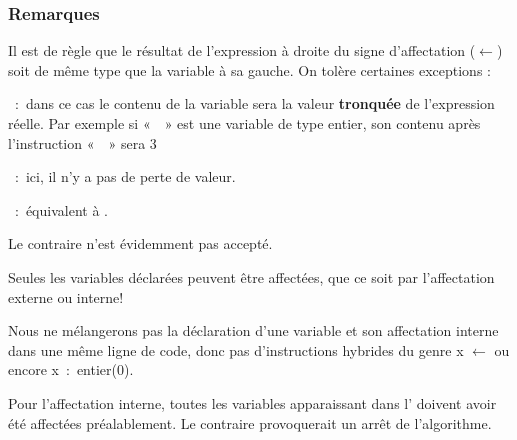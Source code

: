 			
			\subsubsection*{Remarques}

			\begin{liste}
			\item
				Il est de règle que le résultat de l’expression à droite du signe
				d’affectation ($\gets$) soit de
				même type que la variable à sa gauche. On tolère certaines exceptions
				:
				\begin{liste}
				\item
					~:~dans ce cas le contenu de la variable sera 
                    la valeur \textbf{tronquée} de l’expression réelle. 
					Par exemple si «~~» est
					une variable de type entier, son contenu après l’instruction
					«~~» 
					sera 3
				\item 
					~:~ici, il n’y a pas de perte de valeur.
				\item 
					~:~équivalent à 
                    .
					
					Le contraire n’est évidemment pas accepté.
				\end{liste}
			\item 
				Seules les variables déclarées peuvent être affectées, que ce soit par
				l’affectation externe ou interne!
			\item 
				Nous ne mélangerons pas la déclaration d’une variable et son
				affectation interne dans une même ligne de code, donc pas
				d’instructions hybrides du genre 
				\textsf{x}{ $\gets$ } ou encore 
				\textsf{x~:~entier(0)}.
			\item 
				Pour l’affectation interne, toutes les variables apparaissant dans
				l’ doivent avoir été affectées
				préalablement. Le contraire provoquerait un arrêt de l’algorithme.
			\end{liste}
			
